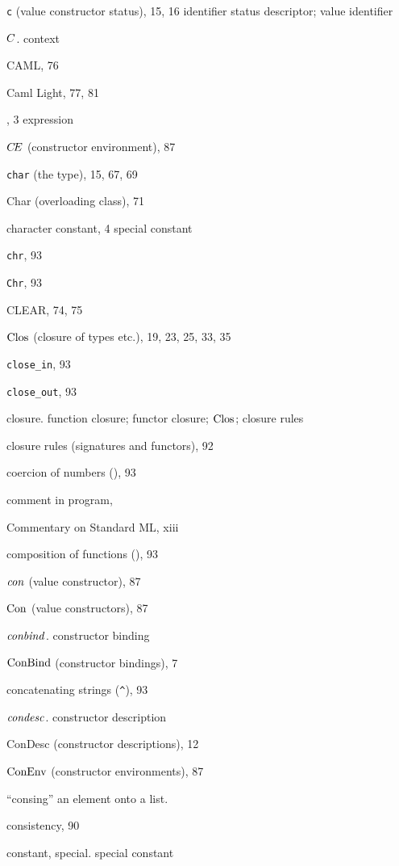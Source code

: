 \begin{theindex}
\item \verb+c+ (value constructor status), 15, 16
\subitem \seealso identifier status descriptor; value identifier
\item $C$. \see context
\item CAML, 76
\item Caml Light, 77, 81
\item \CASE, 3
\subitem \seealso expression
\item $\mbox{$C\!E$}$ (constructor environment), 87 
\item {\tt char} (the type), 15, 67, 69
\item Char (overloading class), 71
\item character constant, 4
\subitem \seealso special constant
\item {\tt chr}, 93
\item {\tt Chr}, 93
\item CLEAR, 74, 75
\item ${\rm Clos}_{}$ (closure of types etc.), 19, 23, 25, 33, 35
\item \verb+close_in+, 93
\item \verb+close_out+, 93
\item closure. \see function closure; functor closure; ${\rm Clos}_{}$; closure rules
\item closure rules (signatures and functors), 92
\item coercion of numbers (), 93
\item comment in program, \commentrefs
\item Commentary on Standard ML, xiii
\item composition of functions (), 93
\item ${\it con}$ (value constructor), 87
\item ${\rm Con}$ (value constructors), 87
\item ${\it conbind}$. \see constructor binding
\item ${\rm ConBind}$ (constructor bindings), 7
\item concatenating strings (\verb+^+), 93
\item ${\it condesc}$. \see constructor description
\item ConDesc (constructor descriptions), 12
\item ${\rm ConEnv}$ (constructor environments), 87
\item ``consing'' an element onto a list. \see \ml{::}
\item consistency, 90
\item constant, special. \see special constant 

\end{theindex}
